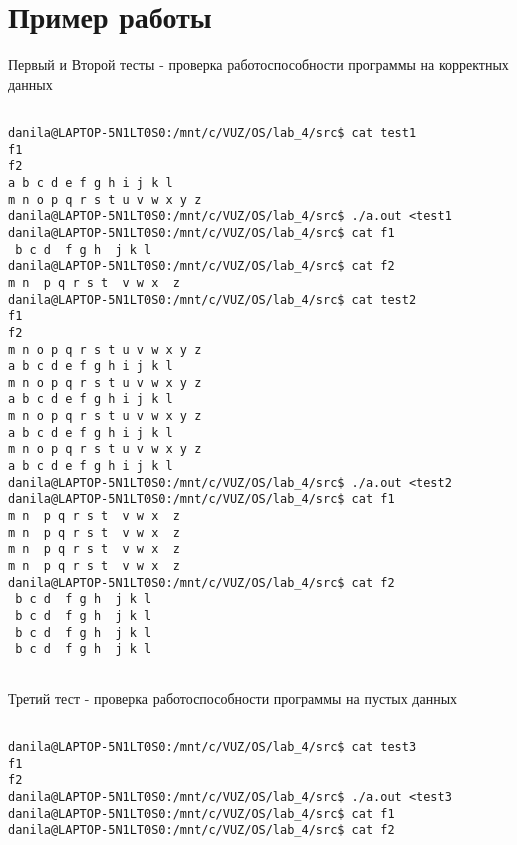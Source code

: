 \section{Пример работы}

Первый и Второй тесты - проверка работоспособности программы на корректных данных

\begin{verbatim}

danila@LAPTOP-5N1LT0S0:/mnt/c/VUZ/OS/lab_4/src$ cat test1
f1
f2
a b c d e f g h i j k l
m n o p q r s t u v w x y z
danila@LAPTOP-5N1LT0S0:/mnt/c/VUZ/OS/lab_4/src$ ./a.out <test1
danila@LAPTOP-5N1LT0S0:/mnt/c/VUZ/OS/lab_4/src$ cat f1
 b c d  f g h  j k l 
danila@LAPTOP-5N1LT0S0:/mnt/c/VUZ/OS/lab_4/src$ cat f2
m n  p q r s t  v w x  z
danila@LAPTOP-5N1LT0S0:/mnt/c/VUZ/OS/lab_4/src$ cat test2
f1
f2
m n o p q r s t u v w x y z
a b c d e f g h i j k l
m n o p q r s t u v w x y z
a b c d e f g h i j k l
m n o p q r s t u v w x y z
a b c d e f g h i j k l
m n o p q r s t u v w x y z
a b c d e f g h i j k l
danila@LAPTOP-5N1LT0S0:/mnt/c/VUZ/OS/lab_4/src$ ./a.out <test2
danila@LAPTOP-5N1LT0S0:/mnt/c/VUZ/OS/lab_4/src$ cat f1
m n  p q r s t  v w x  z
m n  p q r s t  v w x  z
m n  p q r s t  v w x  z
m n  p q r s t  v w x  z
danila@LAPTOP-5N1LT0S0:/mnt/c/VUZ/OS/lab_4/src$ cat f2
 b c d  f g h  j k l 
 b c d  f g h  j k l 
 b c d  f g h  j k l
 b c d  f g h  j k l
 
\end{verbatim}

Третий тест - проверка работоспособности программы на пустых данных

\begin{verbatim}
 
danila@LAPTOP-5N1LT0S0:/mnt/c/VUZ/OS/lab_4/src$ cat test3
f1
f2
danila@LAPTOP-5N1LT0S0:/mnt/c/VUZ/OS/lab_4/src$ ./a.out <test3
danila@LAPTOP-5N1LT0S0:/mnt/c/VUZ/OS/lab_4/src$ cat f1
danila@LAPTOP-5N1LT0S0:/mnt/c/VUZ/OS/lab_4/src$ cat f2

\end{verbatim}

\pagebreak



